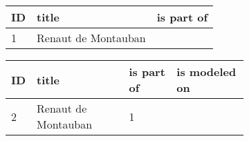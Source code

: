\begin{figure}[htb!]

    \begin{subfigure}{\textwidth}
        \begin{center}
        \begin{tabular}{|p{}|p{}|p{}|}
            \hline
            \textbf{ID} & \textbf{title} & \textbf{is part of} \\ \hline
            1 & Renaut de Montauban & \\ \hline
        \end{tabular}
        \end{center}
    \label{sub:Cycle}
    \vspace*{1em}
    \end{subfigure}

    \begin{subfigure}{\textwidth}
        \begin{center}
        \begin{tabular}{|p{}|p{}|p{}|p{}|}
            \hline
            \textbf{ID} & \textbf{title} & \textbf{is part of} & \textbf{is modeled on} \\ \hline
            2 & Renaut de Montauban & 1 & \\ \hline
        \end{tabular}
        \end{center}
    \label{sub:Work}
    \vspace*{1em}
    \end{subfigure}


\end{figure}
